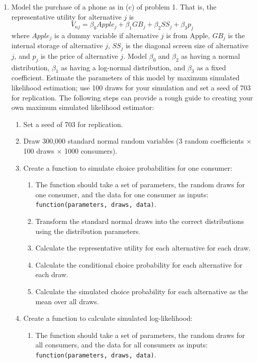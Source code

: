 \documentclass[11pt,letterpaper]{article}
\begin{document}
\begin{enumerate}[label=\alph*., leftmargin=*]
	\item Model the purchase of a phone as in (c) of problem 1. That is, the representative utility for alternative $j$ is
	$$V_{nj} = \beta_0 Apple_j + \beta_1 GB_j + \beta_2 SS_j + \beta_3 p_j$$
	where $Apple_j$ is a dummy variable if alternative $j$ is from Apple, $GB_j$ is the internal storage of alternative $j$, $SS_j$ is the diagonal screen size of alternative $j$, and $p_j$ is the price of alternative $j$. Model $\beta_0$ and $\beta_2$ as having a normal distribution, $\beta_1$ as having a log-normal distribution, and $\beta_3$ as a fixed coefficient. Estimate the parameters of this model by maximum simulated likelihood estimation; use 100 draws for your simulation and set a seed of 703 for replication. The following steps can provide a rough guide to creating your own maximum simulated likelihood estimator:
	\begin{enumerate}[label=\Roman*.]
		\item Set a seed of 703 for replication.
		\item Draw 300,000 standard normal random variables (3 random coefficients $\times$ 100 draws $\times$ 1000 consumers).
		\item Create a function to simulate choice probabilities for one consumer:
		\begin{enumerate}[label=\roman*.]
			\item The function should take a set of parameters, the random draws for one consumer, and the data for one consumer as inputs: \texttt{function(parameters, draws, data)}.
			\item Transform the standard normal draws into the correct distributions using the distribution parameters.
			\item Calculate the representative utility for each alternative for each draw.
			\item Calculate the conditional choice probability for each alternative for each draw.
			\item Calculate the simulated choice probability for each alternative as the mean over all draws.
		\end{enumerate}
		\item Create a function to calculate simulated log-likelihood:
		\begin{enumerate}[label=\roman*.]
			\item The function should take a set of parameters, the random draws for all consumers, and the data for all consumers as inputs: \texttt{function(parameters, draws, data)}.

\end{enumerate}
\end{enumerate}
\end{enumerate}
\end{document}
